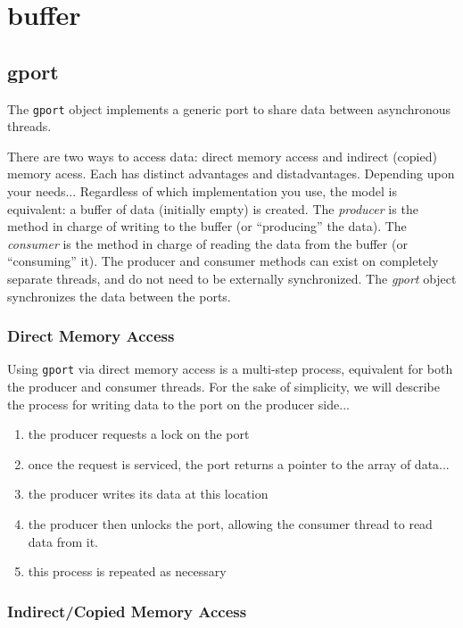 % 
%
\section{buffer}
\label{module:buffer}

%
%
\subsection{gport}
\label{module:buffer:gport}
The {\tt gport} object implements a generic port to share data
between asynchronous threads.

There are two ways to access data: direct memory access and 
indirect (copied) memory acess.
Each has distinct advantages and distadvantages.
Depending upon your needs...
Regardless of which implementation you use, the model is equivalent:
a buffer of data (initially empty) is created.
The {\it producer} is the method in charge of writing to the buffer (or
``producing'' the data).
The {\it consumer} is the method in charge of reading the data from the buffer
(or ``consuming'' it).
The producer and consumer methods can exist on completely separate threads,
and do not need to be externally synchronized.
The {\it gport} object synchronizes the data between the ports.

\subsubsection{Direct Memory Access}
Using {\tt gport} via direct memory access is a multi-step process, equivalent
for both the producer and consumer threads.
For the sake of simplicity, we will describe the process for writing data to
the port on the producer side...

\begin{enumerate}
\item the producer requests a lock on the port
\item once the request is serviced, the port returns a pointer to the array of
      data...
\item the producer writes its data at this location
\item the producer then unlocks the port, allowing the consumer thread to read
      data from it.
\item this process is repeated as necessary
\end{enumerate}



\subsubsection{Indirect/Copied Memory Access}

